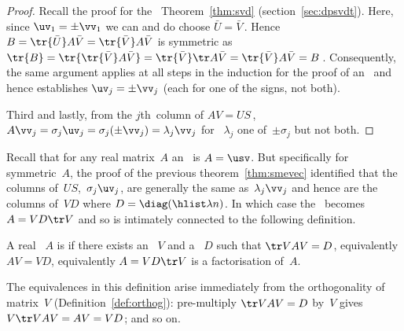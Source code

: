 \begin{proof}
Recall the  proof for the \svd\ Theorem~\ref{thm:svd}  (section~\ref{sec:dpsvdt}).  
Here, since \(\uv_1=\pm\vv_1\) we can and do choose \(\bar U=\bar V\)\,.  
Hence \(B=\tr{\bar U}A\bar V =\tr{\bar V}A\bar V \) is symmetric as \(\tr{B} =\tr{\tr{\bar V}A\bar V} =\tr{\bar V}\tr A\bar V =\tr{\bar V}A\bar V =B\)\,.
Consequently, the same argument applies at all steps in the induction for the proof of an \svd\ and hence establishes \(\uv_j=\pm\vv_j\) (each for one of the signs, not both).

Third and lastly,  from the \(j\)th~column of \(AV=US\)\,, \(A\vv_j=\sigma_j\uv_j=\sigma_j(\pm \vv_j)=\lambda_j\vv_j\) for ~\(\lambda_j\) one of~\(\pm \sigma_j\) but not both.
\end{proof}

\begin{comment}
For duplicated \idx{singular value}s, there are \idx{eigenvector}s in the span of the \idx{singular vector}s.  
But appears difficult to prove.  
Could come down to solutions of \(Q^2=I\) for orthogonal matrix~\(Q\).
Equivalent to proving the Fundamental Theorem of Algebra that there are \(n\)~zeros of an \(n\)th~degree polynomial \pooliv{p.D8}.
\end{comment}


Recall that for any real matrix~\(A\) an \svd\ is \(A=\usv\).
But specifically for symmetric~\(A\), the proof of the previous theorem~\ref{thm:smevec} identified that the columns of~\(US\),~\(\sigma_j\uv_j\), are generally the same as~\(\lambda_j\vv_j\) and hence are the columns of~\(VD\) where \(D=\diag(\hlist\lambda n)\).
In which case the \svd\ becomes \(A=VD\tr V\) and so is intimately connected to the following definition.


\begin{definition} \label{def:} 
A real ~\(A\) is  if there exists an ~\(V\) and a ~\(D\) such that \(\tr VAV=D\), equivalently \(AV=VD\), equivalently \(A=VD\tr V\) is a factorisation of~\(A\).
\end{definition}

The equivalences in this definition arise immediately from the orthogonality of matrix~\(V\) (Definition~\ref{def:orthog}): pre-multiply \(\tr VAV=D\) by~\(V\) gives \(V\tr VAV=AV=VD\); and so on.

